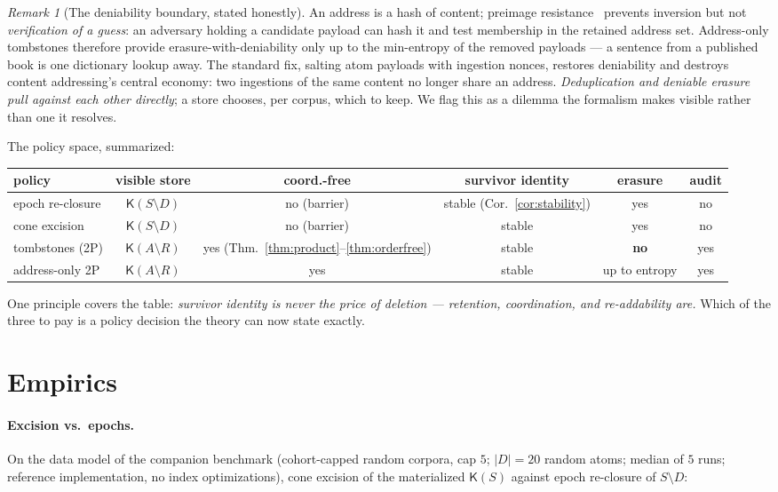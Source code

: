 \documentclass[11pt]{article}
\theoremstyle{definition}
\theoremstyle{remark}
\newtheorem{remark}[theorem]{Remark}
\newcommand{\K}{\mathsf{K}}
\newcommand{\diffop}{\setminus}
\begin{document}
\begin{remark}[The deniability boundary, stated honestly]\label{rem:entropy}
An address is a hash of content; preimage resistance~\cite{RogawayShrimpton04} prevents inversion but not \emph{verification of a guess}: an adversary holding a candidate payload can hash it and test membership in the retained address set. Address-only tombstones therefore provide erasure-with-deniability only up to the min-entropy of the removed payloads --- a sentence from a published book is one dictionary lookup away. The standard fix, salting atom payloads with ingestion nonces, restores deniability and destroys content addressing's central economy: two ingestions of the same content no longer share an address. \emph{Deduplication and deniable erasure pull against each other directly}; a store chooses, per corpus, which to keep. We flag this as a dilemma the formalism makes visible rather than one it resolves.
\end{remark}

The policy space, summarized:

\begin{center}\small
\begin{tabular}{lccccc}
\toprule
policy & visible store & coord.-free & survivor identity & erasure & audit \\
\midrule
epoch re-closure & $\K(S\diffop D)$ & no (barrier) & stable (Cor.~\ref{cor:stability}) & yes & no \\
cone excision & $\K(S\diffop D)$ & no (barrier) & stable & yes & no \\
tombstones (2P) & $\K(A\diffop R)$ & yes (Thm.~\ref{thm:product}--\ref{thm:orderfree}) & stable & \textbf{no} & yes \\
address-only 2P & $\K(A\diffop R)$ & yes & stable & up to entropy & yes \\
\bottomrule
\end{tabular}
\end{center}

\noindent One principle covers the table: \emph{survivor identity is never the price of deletion --- retention, coordination, and re-addability are.} Which of the three to pay is a policy decision the theory can now state exactly.

\section{Empirics}\label{sec:empirics}

\paragraph{Excision vs.\ epochs.} On the data model of the companion benchmark (cohort-capped random corpora, cap $5$; $|D| = 20$ random atoms; median of $5$ runs; reference implementation, no index optimizations), cone excision of the materialized $\K(S)$ against epoch re-closure of $S \diffop D$:
\end{document}

